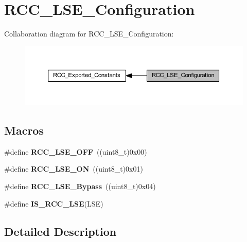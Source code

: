 \hypertarget{group___r_c_c___l_s_e___configuration}{}\section{R\+C\+C\+\_\+\+L\+S\+E\+\_\+\+Configuration}
\label{group___r_c_c___l_s_e___configuration}
Collaboration diagram for R\+C\+C\+\_\+\+L\+S\+E\+\_\+\+Configuration\+:
\nopagebreak
\begin{figure}[H]
\begin{center}
\leavevmode
\includegraphics[width=350pt]{group___r_c_c___l_s_e___configuration}
\end{center}
\end{figure}
\subsection*{Macros}
\begin{DoxyCompactItemize}
\item 
\mbox{\label{group___r_c_c___l_s_e___configuration_ga6645c27708d0cad1a4ab61d2abb24c77}} 
\#define {\bfseries R\+C\+C\+\_\+\+L\+S\+E\+\_\+\+O\+FF}~((uint8\+\_\+t)0x00)
\item 
\mbox{\label{group___r_c_c___l_s_e___configuration_gac981ea636c2f215e4473901e0912f55a}} 
\#define {\bfseries R\+C\+C\+\_\+\+L\+S\+E\+\_\+\+ON}~((uint8\+\_\+t)0x01)
\item 
\mbox{\label{group___r_c_c___l_s_e___configuration_gac911af00bffa1bd1b1676f582a8a88e1}} 
\#define {\bfseries R\+C\+C\+\_\+\+L\+S\+E\+\_\+\+Bypass}~((uint8\+\_\+t)0x04)
\item 
\#define {\bfseries I\+S\+\_\+\+R\+C\+C\+\_\+\+L\+SE}(L\+SE)
\end{DoxyCompactItemize}


\subsection{Detailed Description}


